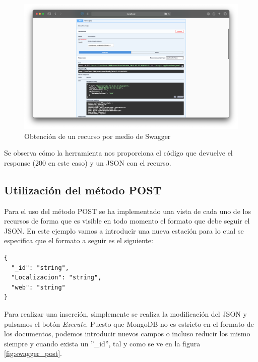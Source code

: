 \begin{figure}[h]
    \centering
    \includegraphics[width=\textwidth]{include/resultados/SwaggerGet.png}
    \caption{Obtención de un recurso por medio de Swagger}
    \label{fig:swagger_get}
\end{figure}

Se observa cómo la herramienta nos proporciona el código que devuelve el response (200 en este caso) y un JSON con el recurso.

\subsection{Utilización del método POST}

Para el uso del método POST se ha implementado una vista de cada uno de los recursos de forma que es visible en todo momento el formato que debe seguir el JSON. En este ejemplo vamos a introducir una nueva estación para lo cual se especifica que el formato a seguir es el siguiente:

\begin{lstlisting}
{
  "_id": "string",
  "Localizacion": "string",
  "web": "string"
}
\end{lstlisting}

Para realizar una inserción, simplemente se realiza la modificación del JSON y pulsamos el botón \textit{Execute}. Puesto que MongoDB no es estricto en el formato de los documentos, podemos introducir nuevos campos o incluso reducir los mismo siempre y cuando exista un ''\_id'', tal y como se ve en la figura \ref{fig:swagger_post}.

